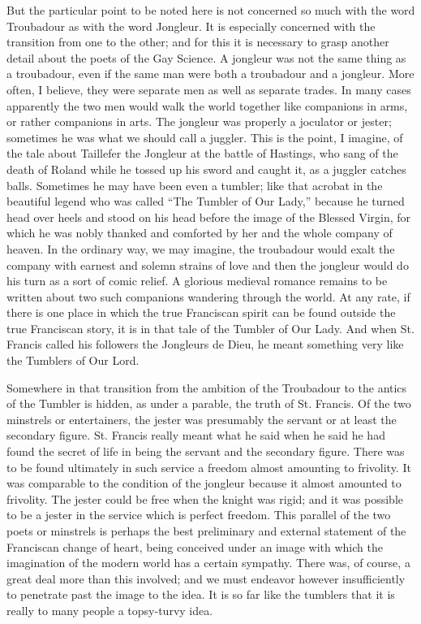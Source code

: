 \documentclass{book}
\begin{document}
But the particular point to be noted here is not concerned so much with the word Troubadour as with the word Jongleur. It is especially concerned with the transition from one to the other; and for this it is necessary to grasp another detail about the poets of the Gay Science. A jongleur was not the same thing as a troubadour, even if the same man were both a troubadour and a jongleur. More often, I believe, they were separate men as well as separate trades. In many cases apparently the two men would walk the world together like companions in arms, or rather companions in arts. The jongleur was properly a joculator or jester; sometimes he was what we should call a juggler. This is the point, I imagine, of the tale about Taillefer the Jongleur at the battle of Hastings, who sang of the death of Roland while he tossed up his sword and caught it, as a juggler catches balls. Sometimes he may have been even a tumbler; like that acrobat in the beautiful legend who was called “The Tumbler of Our Lady,” because he turned head over heels and stood on his head before the image of the Blessed Virgin, for which he was nobly thanked and comforted by her and the whole company of heaven. In the ordinary way, we may imagine, the troubadour would exalt the company with earnest and solemn strains of love and then the jongleur would do his turn as a sort of comic relief. A glorious medieval romance remains to be written about two such companions wandering through the world. At any rate, if there is one place in which the true Franciscan spirit can be found outside the true Franciscan story, it is in that tale of the Tumbler of Our Lady. And when St. Francis called his followers the Jongleurs de Dieu, he meant something very like the Tumblers of Our Lord.

Somewhere in that transition from the ambition of the Troubadour to the antics of the Tumbler is hidden, as under a parable, the truth of St. Francis. Of the two minstrels or entertainers, the jester was presumably the servant or at least the secondary figure. St. Francis really meant what he said when he said he had found the secret of life in being the servant and the secondary figure. There was to be found ultimately in such service a freedom almost amounting to frivolity. It was comparable to the condition of the jongleur because it almost amounted to frivolity. The jester could be free when the knight was rigid; and it was possible to be a jester in the service which is perfect freedom. This parallel of the two poets or minstrels is perhaps the best preliminary and external statement of the Franciscan change of heart, being conceived under an image with which the imagination of the modern world has a certain sympathy. There was, of course, a great deal more than this involved; and we must endeavor however insufficiently to penetrate past the image to the idea. It is so far like the tumblers that it is really to many people a topsy-turvy idea.
\end{document}
